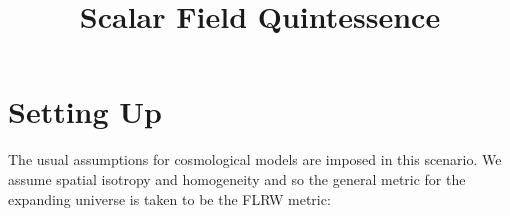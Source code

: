 \documentclass{article}
\begin{document}
\title{Scalar Field Quintessence}

\section*{Setting Up}

The usual assumptions for cosmological models are imposed in this scenario. We assume spatial isotropy and homogeneity and so the general metric for the expanding universe is taken to be the FLRW metric:
\end{document}
